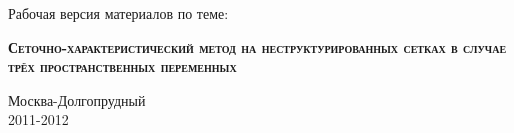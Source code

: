 \begin{titlepage}
\newpage

\begin{center}
\end{center}

\vspace{2em}

\begin{center}
Рабочая версия материалов по теме:
\end{center}

\vspace{5em}

\begin{center}
\textsc{\textbf{Сеточно-характеристический метод на неструктурированных сетках в случае трёх пространственных переменных}}
\end{center}

\vspace{\fill}
\begin{center}
Москва-Долгопрудный\\
2011-2012
\end{center}

\end{titlepage}
